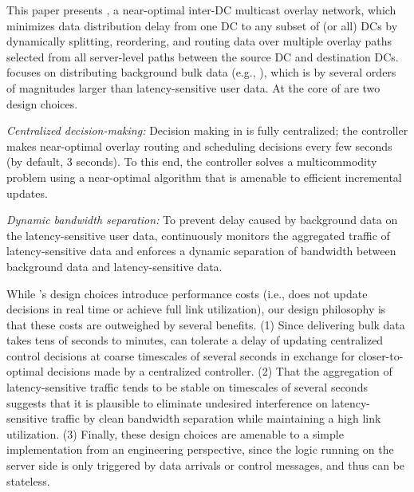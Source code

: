 This paper presents {\em \name}, a near-optimal inter-DC multicast 
overlay network, which minimizes data distribution delay from one 
DC to any subset of (or all) DCs by dynamically splitting, 
reordering, and routing data over multiple overlay paths selected 
from all server-level paths between the source DC and destination DCs.
\name focuses on distributing background bulk data (e.g., \fillme), 
which is by several orders of magnitudes larger than 
latency-sensitive user data.
At the core of \name are two design choices.
\begin{packeditemize} 
\item {\em Centralized decision-making:} 
Decision making in \name is fully centralized; the \name controller 
makes near-optimal overlay routing and scheduling decisions every 
few seconds (by default, 3 seconds).
To this end, the controller solves a multicommodity problem using 
a near-optimal algorithm that is amenable to efficient incremental 
updates.
\item {\em Dynamic bandwidth separation:}
To prevent delay caused by background data on the 
latency-sensitive user data, \name continuously monitors the 
aggregated traffic 
of latency-sensitive data and enforces a dynamic  separation of 
bandwidth between background data and latency-sensitive data. 
\end{packeditemize}


While \name's design choices introduce performance costs (i.e.,
\name does not update decisions in real time or achieve full 
link utilization), our design philosophy is that these costs are 
outweighed by several benefits.
(1) Since delivering bulk data takes tens of seconds to 
minutes, \name can tolerate a delay of updating centralized 
control decisions at coarse timescales of several 
seconds in exchange for closer-to-optimal decisions made by a 
centralized controller.
(2) That the aggregation of latency-sensitive traffic tends to 
be stable on timescales of several seconds suggests that it is 
plausible to eliminate undesired interference on 
latency-sensitive traffic by clean bandwidth separation 
while maintaining a high link utilization.
(3) Finally, these design choices are amenable to a simple
implementation from an engineering perspective, 
since the logic running on the server side is 
only triggered by data arrivals or control messages, and 
thus can be stateless.


